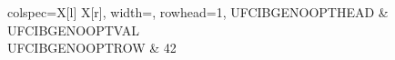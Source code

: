 \documentclass{abntexto-ufc}
\begin{document}
\begin{ufcibgelongtblr}{
  colspec={X[l] X[r]},
  width=\linewidth,
  rowhead=1,
}
\toprule
UFCIBGENOOPTHEAD & UFCIBGENOOPTVAL \\
\midrule
UFCIBGENOOPTROW & 42 \\
\end{ufcibgelongtblr}
\end{document}

